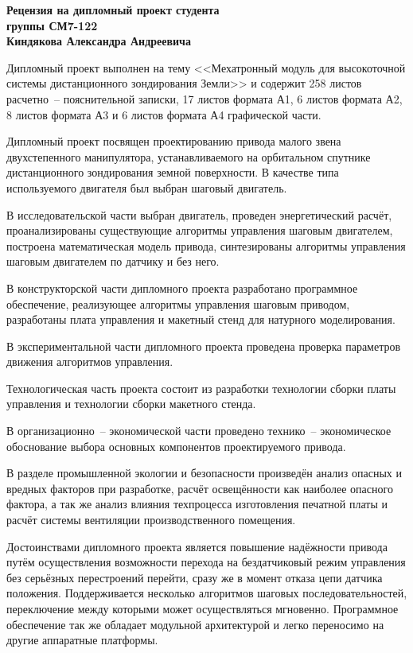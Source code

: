 \documentclass[a4paper, 11pt]{article}
\newcommand\studentnameheader{Киндякова Александра Андреевича}
\begin{document}
\begin{center}
    {\large \textbf{Рецензия на дипломный проект студента \\ группы СМ7-122 \\ \studentnameheader}}
\end{center}

Дипломный проект выполнен на тему <<Мехатронный модуль для высокоточной системы
дистанционного зондирования Земли>> и содержит 258 листов расчетно~-- пояснительной
записки, 17 листов формата А1, 6 листов формата А2, 8 листов формата А3 и 6 листов
формата А4 графической части.

Дипломный проект посвящен проектированию привода малого звена двухстепенного
манипулятора, устанавливаемого на орбитальном спутнике дистанционного зондирования
земной поверхности. В качестве типа используемого двигателя был выбран шаговый
двигатель.

В исследовательской части выбран двигатель, проведен энергетический расчёт,
проанализированы существующие алгоритмы управления шаговым двигателем,
построена математическая модель привода, синтезированы алгоритмы управления
шаговым двигателем по датчику и без него.

В конструкторской части дипломного проекта разработано программное обеспечение,
реализующее алгоритмы управления шаговым приводом, разработаны плата управления
и макетный стенд для натурного моделирования.

В экспериментальной части дипломного проекта проведена проверка параметров
движения алгоритмов управления.

Технологическая часть проекта состоит из разработки технологии сборки платы
управления и технологии сборки макетного стенда.

В организационно~-- экономической части проведено технико~-- экономическое
обоснование выбора основных компонентов проектируемого привода.

В разделе промышленной экологии и безопасности произведён анализ опасных и
вредных факторов при разработке, расчёт освещённости как наиболее опасного фактора,
а так же анализ влияния техпроцесса изготовления печатной платы и расчёт системы
вентиляции производственного помещения.

Достоинствами дипломного проекта является повышение надёжности привода путём
осуществления возможности перехода на бездатчиковый режим управления без
серьёзных перестроений перейти, сразу же в момент отказа цепи датчика положения.
Поддерживается несколько алгоритмов шаговых последовательностей, переключение
между которыми может осуществляться мгновенно. Программное обеспечение так же
обладает модульной архитектурой и легко переносимо на другие аппаратные платформы.
\end{document}
